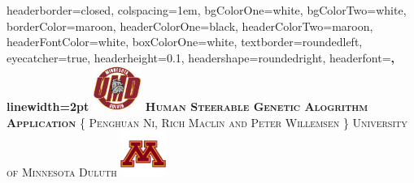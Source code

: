 \documentclass[landscape,a0paper,fontscale=0.275]{baposter} %
\begin{document}
	\begin{poster}
	{
	headerborder=closed, %
	colspacing=1em, %
	bgColorOne=white, %
	bgColorTwo=white, %
	borderColor=maroon,
	headerColorOne=black, %
	headerColorTwo=maroon,
	headerFontColor=white, %
	boxColorOne=white, %
	textborder=roundedleft, %
	eyecatcher=true, %
	headerheight=0.1\textheight, %
	headershape=roundedright, %
	headerfont=\Large\bf\textsc, %
	linewidth=2pt %
	}
	{\includegraphics[height=4em]{UMD.png}}
	{\bf\textsc{Human Steerable Genetic Alogrithm Application}\vspace{0.5em}} %
	{\textsc{\{ Penghuan Ni, Rich Maclin and Peter Willemsen \} \hspace{12pt} University of Minnesota Duluth}} %
	{\includegraphics[height=4em]{UMN.jpg}}


\end{poster}
\end{document}
